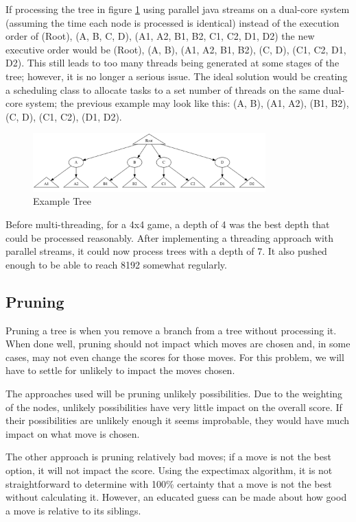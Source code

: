 \documentclass{article}
\begin{document}
If processing the tree in figure \ref{fig:threadtree} using parallel java streams on a dual-core system (assuming the time each node is processed is identical) instead of the execution order of (Root), (A, B, C, D), (A1, A2, B1, B2, C1, C2, D1, D2) the new executive order would be (Root), (A, B), (A1, A2, B1, B2), (C, D), (C1, C2, D1, D2). This still leads to too many threads being generated at some stages of the tree; however, it is no longer a serious issue. The ideal solution would be creating a scheduling class to allocate tasks to a set number of threads on the same dual-core system; the previous example may look like this: (A, B), (A1, A2), (B1, B2), (C, D), (C1, C2), (D1, D2).
\begin{figure}
    \centering
    \includegraphics[width=0.8\textwidth]{tree.png}
    \caption{Example Tree}
    \label{fig:threadtree}
\end{figure}

Before multi-threading, for a 4x4 game, a depth of 4 was the best depth that could be processed reasonably. After implementing a threading approach with parallel streams, it could now process trees with a depth of 7. It also pushed enough to be able to reach 8192 somewhat regularly.

\subsection{Pruning}
\label{subsec:Pruning}
Pruning a tree is when you remove a branch from a tree without processing it. When done well, pruning should not impact which moves are chosen and, in some cases, may not even change the scores for those moves. For this problem, we will have to settle for unlikely to impact the moves chosen. 

The approaches used will be pruning unlikely possibilities. Due to the weighting of the nodes, unlikely possibilities have very little impact on the overall score. If their possibilities are unlikely enough it seems improbable, they would have much impact on what move is chosen. 

The other approach is pruning relatively bad moves; if a move is not the best option, it will not impact the score. Using the expectimax algorithm, it is not straightforward to determine with 100\% certainty that a move is not the best without calculating it. However, an educated guess can be made about how good a move is relative to its siblings.
\end{document}

